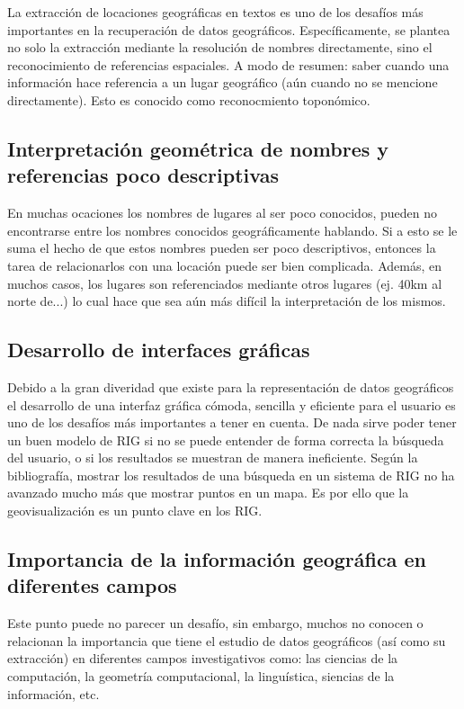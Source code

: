 La extracción de locaciones geográficas en textos es uno de los desafíos más
importantes en la recuperación de datos geográficos. Específicamente, se plantea
no solo la extracción mediante la resolución de nombres directamente, sino
el reconocimiento de referencias espaciales. A modo de resumen: saber cuando una
información hace referencia a un lugar geográfico (aún cuando no se mencione
directamente). Esto es conocido como reconocmiento toponómico.

\subsection{Interpretación geométrica de nombres y referencias poco
descriptivas}\label{sec:geom}

En muchas ocaciones los nombres de lugares al ser poco conocidos, pueden no
encontrarse entre los nombres conocidos geográficamente hablando. Si a esto
se le suma el hecho de que estos nombres pueden ser poco descriptivos, entonces
la tarea de relacionarlos con una locación puede ser bien complicada. Además,
en muchos casos, los lugares son referenciados mediante otros lugares (ej. 
40km al norte de...) lo cual hace que sea aún más difícil la interpretación de
los mismos.

\subsection{Desarrollo de interfaces gráficas}\label{sec:gui}

Debido a la gran diveridad que existe para la representación de datos
geográficos el desarrollo de una interfaz gráfica cómoda, sencilla y eficiente
para el usuario es uno de los desafíos más importantes a tener en cuenta. De
nada sirve poder tener un buen modelo de RIG si no se puede entender de forma
correcta la búsqueda del usuario, o si los resultados se muestran de manera
ineficiente. Según la bibliografía, mostrar los resultados de una búsqueda en
un sistema de RIG no ha avanzado mucho más que mostrar puntos en un mapa. Es
por ello que la geovisualización es un punto clave en los RIG.


\subsection{Importancia de la información geográfica en diferentes
campos}\label{sec:import}

Este punto puede no parecer un desafío, sin embargo, muchos no conocen o relacionan
la importancia que tiene el estudio de datos geográficos (así como su extracción)
en diferentes campos investigativos como: las ciencias de la computación, la 
geometría computacional, la linguística, siencias de la información, etc.

